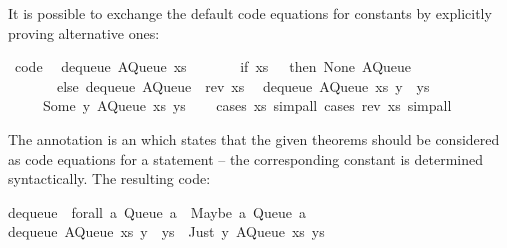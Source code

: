 \begin{isabellebody}
\begin{isamarkuptext}
  It is possible to exchange the default code equations for constants
  by explicitly proving alternative ones:%
\end{isamarkuptext}%
\isamarkuptrue%
%
\isadelimquote
%
\endisadelimquote
%
\isatagquote
{}\isamarkupfalse%
\ {\isacharbrackleft}code{\isacharbrackright}{\isacharcolon}\isanewline
\ \ {\isachardoublequoteopen}dequeue\ {\isacharparenleft}AQueue\ xs\ {\isacharbrackleft}{\isacharbrackright}{\isacharparenright}\ {\isacharequal}\isanewline
\ \ \ \ \ {\isacharparenleft}if\ xs\ {\isacharequal}\ {\isacharbrackleft}{\isacharbrackright}\ then\ {\isacharparenleft}None{\isacharcomma}\ AQueue\ {\isacharbrackleft}{\isacharbrackright}\ {\isacharbrackleft}{\isacharbrackright}{\isacharparenright}\isanewline
\ \ \ \ \ \ \ else\ dequeue\ {\isacharparenleft}AQueue\ {\isacharbrackleft}{\isacharbrackright}\ {\isacharparenleft}rev\ xs{\isacharparenright}{\isacharparenright}{\isacharparenright}{\isachardoublequoteclose}\isanewline
\ \ {\isachardoublequoteopen}dequeue\ {\isacharparenleft}AQueue\ xs\ {\isacharparenleft}y\ {\isacharhash}\ ys{\isacharparenright}{\isacharparenright}\ {\isacharequal}\isanewline
\ \ \ \ \ {\isacharparenleft}Some\ y{\isacharcomma}\ AQueue\ xs\ ys{\isacharparenright}{\isachardoublequoteclose}\isanewline
\ \ \isamarkupfalse%
\ {\isacharparenleft}cases\ xs{\isacharcomma}\ simp{\isacharunderscore}all{\isacharparenright}\ {\isacharparenleft}cases\ {\isachardoublequoteopen}rev\ xs{\isachardoublequoteclose}{\isacharcomma}\ simp{\isacharunderscore}all{\isacharparenright}%
\endisatagquote
{\isafoldquote}%
%
\isadelimquote
%
\endisadelimquote
%
\begin{isamarkuptext}%
\noindent The annotation  is an 
  which states that the given theorems should be considered as code
  equations for a  statement -- the corresponding constant
  is determined syntactically.  The resulting code:%
\end{isamarkuptext}%
\isamarkuptrue%
%
\isadelimtypewriter
%
\endisadelimtypewriter
%
\isatagtypewriter
%
\begin{isamarkuptext}%
dequeue\ {\isacharcolon}{\isacharcolon}\ forall\ a{\isachardot}\ Queue\ a\ {\isacharminus}{\isachargreater}\ {\isacharparenleft}Maybe\ a{\isacharcomma}\ Queue\ a{\isacharparenright}{\isacharsemicolon}\isanewline
dequeue\ {\isacharparenleft}AQueue\ xs\ {\isacharparenleft}y\ {\isacharcolon}\ ys{\isacharparenright}{\isacharparenright}\ {\isacharequal}\ {\isacharparenleft}Just\ y{\isacharcomma}\ AQueue\ xs\ ys{\isacharparenright}{\isacharsemicolon}\isanewline

\end{isamarkuptext}
\end{isabellebody}
